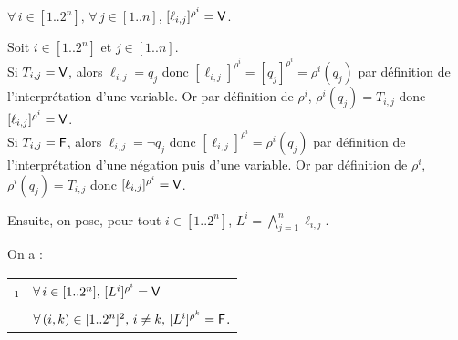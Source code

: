 			\begin{Lemme}
				\(\forall \, i \in [1..2^n], \, \forall \, j \in [1..n]\), \([\ell_{i,j}]^{\rho^i} = \text{\sf{V}}\).
			\end{Lemme}
			
			\begin{Preuve}
				Soit \(i \in [1..2^n]\) et \(j \in [1..n]\). \\[2mm]
				\bdot Si \(T_{i,j} = \text{\sf{V}}\), alors \(\ell_{i,j} = q_j\) donc \([\ell_{i,j}]^{\rho^i} = [q_j]^{\rho^i} = \rho^i (q_j)\) par définition de l'interprétation d'une variable. Or par définition de \(\rho^i\), \(\rho^i (q_j) = T_{i,j}\) donc \([\ell_{i,j}]^{\rho^i} = \text{\sf{V}}\). \\[1mm]
				\bdot Si \(T_{i,j} = \text{\sf{F}}\), alors \(\ell_{i,j} = \neg q_j\) donc \([\ell_{i,j}]^{\rho^i} = \overline{\rho^i (q_j)}\) par définition de l'interprétation d'une négation puis d'une variable. Or par définition de \(\rho^i\), \(\rho^i (q_j) = T_{i,j}\) donc \([\ell_{i,j}]^{\rho^i} = \text{\sf{V}}\).
			\end{Preuve}
			
			\begin{Notation}
			Ensuite, on pose, pour tout \(i \in [1..2^n]\), \(\displaystyle L^i = \bigwedge_{j=1}^n \ell_{i,j}\). 
			\end{Notation}
		
			\begin{Lemme}
				On a : \!\begin{tabular}[t]{cl}
				\i & \(\forall \, i \in [1..2^n], \, [L^i]^{\rho^i} = \text{\sf{V}}\) \\
				\ii & \(\forall \, (i,k) \in [1..2^n]^2, \, i \neq k, \, [L^i]^{\rho^k} = \text{\sf{F}}\).
				\end{tabular}
			\end{Lemme}	
			
